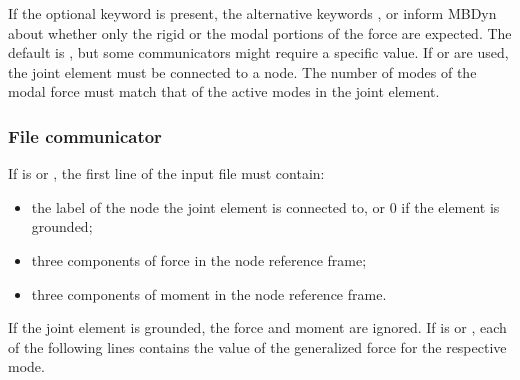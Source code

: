 If the optional keyword  is present,
the alternative keywords ,  or 
inform MBDyn about whether only the rigid or the modal portions
of the force are expected.
The default is , but some communicators might require
a specific value.
If  or  are used, the  joint element
must be connected to a  node.
The number of modes of the modal force must match that of the active modes
in the  joint element.



\subsubsection{File communicator}
If  is  or , the first line of the input file
must contain:
\begin{itemize}
\item the label of the  node the  joint element
	is connected to, or 0 if the element is grounded;
\item three components of force in the  node reference frame;
\item three components of moment in the  node reference frame.
\end{itemize}
If the  joint element is grounded, the force and moment
are ignored.
If  is  or ,
each of the following lines contains the value of the generalized force
for the respective mode.

